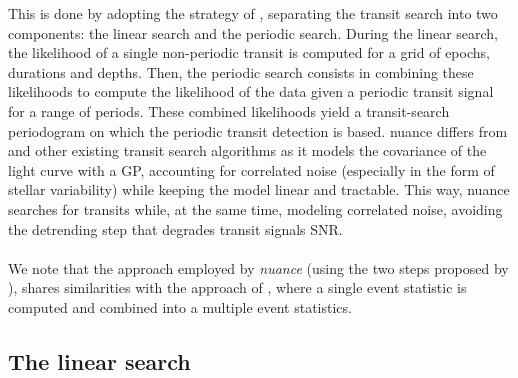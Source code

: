 \documentclass[modern]{aastex631}
\newcommand{\nuancemethod}{\textit{nuance}}
\begin{document}
This is done by adopting the strategy of \cite{foreman2016}, separating the transit search into two components: the linear search and the periodic search. During the linear search, the likelihood of a single non-periodic transit is computed for a grid of epochs, durations and depths. Then, the periodic search consists in combining these likelihoods to compute the likelihood of the data given a periodic transit signal for a range of periods. These combined likelihoods yield a transit-search periodogram on which the periodic transit detection is based. \textsf{nuance} differs from \cite{foreman2016} and other existing transit search algorithms as it models the covariance of the light curve with a GP, accounting for correlated noise (especially in the form of stellar variability) while keeping the model linear and tractable. This way, \textsf{nuance} searches for transits while, at the same time, modeling correlated noise, avoiding the detrending step that degrades transit signals SNR.\\\\
We note that the approach employed by \nuancemethod{} (using the two steps proposed by \citealt{foreman2016}), shares similarities with the approach of \cite{Jenkins2010}, where a single event statistic is computed and combined into a multiple event statistics.

\subsection{The linear search}\label{linear_search}
\end{document}

